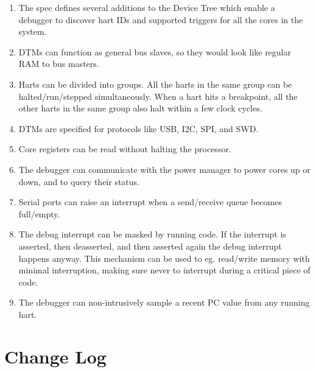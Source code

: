 \documentclass{article}
\begin{document}
\begin{enumerate}
   \item The spec defines several additions to the Device Tree which enable a
      debugger to discover hart IDs and supported triggers for all the cores
      in the system.
   \item DTMs can function as general bus slaves, so they would look like
      regular RAM to bus masters.
   \item Harts can be divided into groups. All the harts in the same group can
      be halted/run/stepped simultaneously. When a hart hits a breakpoint, all
      the other harts in the same group also halt within a few clock cycles.
   \item DTMs are specified for protocols like USB, I2C, SPI, and SWD.
   \item Core registers can be read without halting the processor.
   \item The debugger can communicate with the power manager to power cores up
      or down, and to query their status.
   \item Serial ports can raise an interrupt when a send/receive queue becomes full/empty.
   \item The debug interrupt can be masked by running code. If the interrupt is
      asserted, then deasserted, and then asserted again the debug interrupt
      happens anyway. This mechanism can be used to eg. read/write memory with
      minimal interruption, making sure never to interrupt during a critical
      piece of code.
   \item The debugger can non-intrusively sample a recent PC value from any
      running hart.
\end{enumerate}

\section{Change Log}

\begin{versionhistory}
    
\end{versionhistory}
\end{document}
